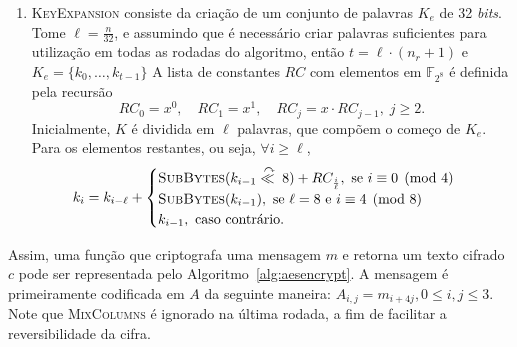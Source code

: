 \documentclass{ufsctex/ufsctex}
\begin{document}
\begin{enumerate}[label=\roman*.]
  \item \textsc{KeyExpansion} consiste da criação de um conjunto de palavras
      $K_e$ de 32 \emph{bits}.  Tome $\ell = \frac{n}{32}$, e assumindo que é
        necessário criar palavras suficientes para utilização em todas as
        rodadas do algoritmo, então $t = \ell \cdot (n_r + 1)$ e $K_e = \{k_0,
        \dots, k_{t - 1}\}$ A lista de constantes $RC$ com elementos em
        $\mathbb{F}_{2^{8}}$ é definida pela recursão
        \begin{equation}
          RC_0 = x^0, \quad RC_1 = x^1, \quad
          RC_j = x \cdot RC_{j-1}, \; j \geq 2.
        \end{equation}
        Inicialmente, $K$ é dividida em $\ell$ palavras, que compõem o começo
        de $K_e$. Para os elementos restantes, ou seja, $\forall i \geq \ell$,
        \begin{equation}
          k_{i} = k_{i - \ell} +
          \begin{cases}
            \textsc{SubBytes}(k_{i - 1}
              \stackrel{\curvearrowright}{\ll{}} 8) + RC_{\frac{i}{\ell}},
              \text{ se } i \equiv 0 \pmod{4} \\
            \textsc{SubBytes}(k_{i - 1}),
              \text{ se } \ell = 8 \text { e } i \equiv 4 \pmod{8} \\
            k_{i - 1}, \text{ caso contrário.}
          \end{cases}
        \end{equation}

\end{enumerate}

Assim, uma função que criptografa uma mensagem $m$ e retorna um texto cifrado
$c$ pode ser representada pelo Algoritmo~\ref{alg:aesencrypt}. A mensagem é
primeiramente codificada em $A$ da seguinte maneira: $A_{i, j} = m_{i + 4j}, 0
\leq i, j \leq 3$.  Note que \textsc{MixColumns} é ignorado na última rodada, a
fim de facilitar a reversibilidade da cifra.
\end{document}
